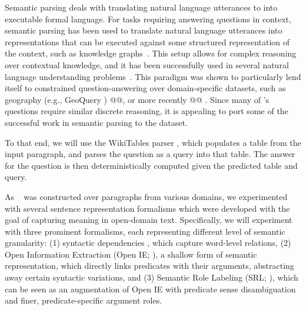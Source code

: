 
Semantic parsing deals with translating natural language utterances to
into executable formal language. For tasks requiring answering questions in context, semantic parsing
has been used to translate natural language utterances into representations that can be
executed against some structured representation of the context, such as knowledge
graphs~\citep[among others]{Zettlemoyer2005LearningTM,berant2013semantic,Yin2017ASN,chen2011learning}.
This setup allows for complex reasoning over contextual knowledge, and it has
been successfully used in several natural language understanding
problems~\citep[among others]{}.
This paradigm was shown to particularly lend itself to constrained question-answering
over domain-specific datasets, such as geography (e.g., GeoQuery \cite{geoquery})
@@, or more recently @@ .
Since many of \drop's questions require similar discrete reasoning, it is appealing
to port some of the successful work in semantic parsing to the \drop dataset.

To that end, we will use the WikiTables parser \cite{Krishnamurthy2017neuralsp},
which populates a table from the input paragraph, and
parses the question as a query into that table.
The answer for the question is then deterministically computed given the predicted table
and query.

As \drop~ was constructed over paragraphs from various domains,
we experimented with several sentence representation formalisms which were
developed with the goal of capturing meaning in open-domain text.
Specifically, we will experiment with three prominent formalisms, each
representing different level of semantic granularity:
(1) syntactic dependencies \cite{sd}, which capture word-level relations,
(2) Open Information Extraction (Open IE; \cite{oie}), a shallow
form of semantic representation, which directly links predicates
with their arguments, abstracting away certain syntactic variations, and
(3) Semantic Role Labeling (SRL; \cite{srl}), which can be seen as an
augmentation of Open IE with predicate sense disambiguation and finer, predicate-specific
argument roles.

